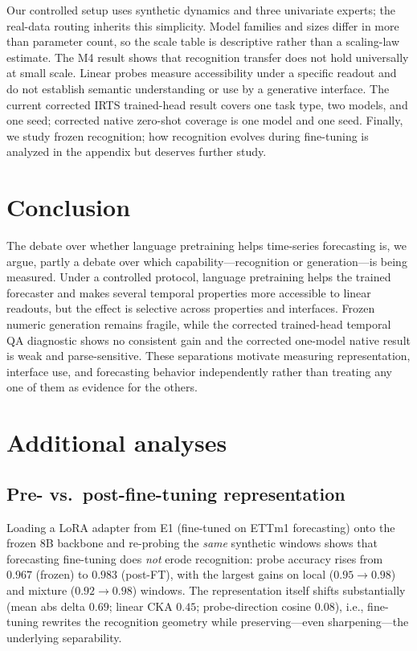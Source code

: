 \documentclass{article}
\begin{document}
Our controlled setup uses synthetic dynamics and three univariate experts; the
real-data routing inherits this simplicity.  Model families and sizes differ
in more than parameter count, so the scale table is descriptive rather than a
scaling-law estimate.  The M4 result shows that recognition transfer does not hold
universally at small scale.  Linear probes measure accessibility under a
specific readout and do not establish semantic understanding or use by a
generative interface.  The current corrected IRTS trained-head result covers
one task type, two models, and one seed; corrected native zero-shot coverage is
one model and one seed.  Finally, we study frozen recognition;
how recognition evolves during fine-tuning is analyzed in the appendix but
deserves further study.

\section{Conclusion}\label{sec:conclusion}

The debate over whether language pretraining helps time-series forecasting is,
we argue, partly a debate over which capability---recognition or
generation---is being measured.  Under a controlled protocol, language
pretraining helps the trained forecaster and makes several temporal properties
more accessible to linear readouts, but the effect is selective across
properties and interfaces.  Frozen numeric generation remains fragile, while
the corrected trained-head temporal QA diagnostic shows no consistent gain and
the corrected one-model native result is weak and parse-sensitive.  These separations motivate
measuring representation, interface use, and forecasting behavior independently
rather than treating any one of them as evidence for the others.




\appendix
\section{Additional analyses}\label{app:extra}

\subsection{Pre- vs.\ post-fine-tuning representation}
\label{app:prepost}
Loading a LoRA adapter from E1 (fine-tuned on ETTm1 forecasting) onto the
frozen $8$B backbone and re-probing the \emph{same} synthetic windows shows
that forecasting fine-tuning does \emph{not} erode recognition: probe accuracy
rises from $0.967$ (frozen) to $0.983$ (post-FT), with the largest gains on
local ($0.95{\to}0.98$) and mixture ($0.92{\to}0.98$) windows.  The
representation itself shifts substantially (mean abs delta $0.69$; linear CKA
$0.45$; probe-direction cosine $0.08$), i.e., fine-tuning rewrites the
recognition geometry while preserving---even sharpening---the underlying
separability.
\end{document}
